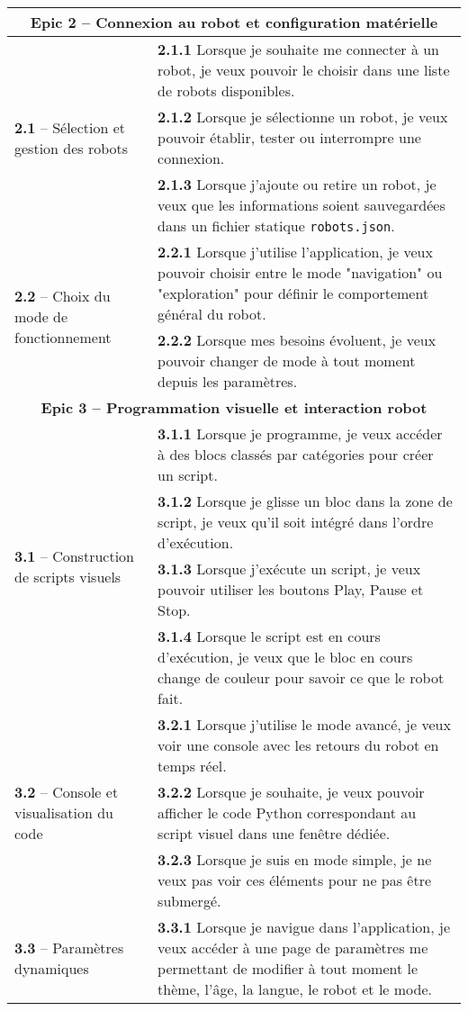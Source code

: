\begin{longtable}{|p{}|p{}|}
\multicolumn{2}{|c|}{\textbf{Epic 2 – Connexion au robot et configuration matérielle}} \\
\hline
\multirow{3}{=}{\textbf{2.1 } – Sélection et gestion des robots} & \textbf{2.1.1}  Lorsque je souhaite me connecter à un robot, je veux pouvoir le choisir dans une liste de robots disponibles. \\
 & \textbf{2.1.2}  Lorsque je sélectionne un robot, je veux pouvoir établir, tester ou interrompre une connexion. \\
 & \textbf{2.1.3}  Lorsque j’ajoute ou retire un robot, je veux que les informations soient sauvegardées dans un fichier statique \texttt{robots.json}. \\
\hline
\multirow{2}{=}{\textbf{2.2 } – Choix du mode de fonctionnement} & \textbf{2.2.1}  Lorsque j’utilise l’application, je veux pouvoir choisir entre le mode "navigation" ou "exploration" pour définir le comportement général du robot. \\
 & \textbf{2.2.2}  Lorsque mes besoins évoluent, je veux pouvoir changer de mode à tout moment depuis les paramètres. \\
\hline

\multicolumn{2}{|c|}{\textbf{Epic 3 – Programmation visuelle et interaction robot}} \\
\hline
\multirow{4}{=}{\textbf{3.1 } – Construction de scripts visuels} & \textbf{3.1.1}  Lorsque je programme, je veux accéder à des blocs classés par catégories pour créer un script. \\
 & \textbf{3.1.2}  Lorsque je glisse un bloc dans la zone de script, je veux qu’il soit intégré dans l’ordre d’exécution. \\
 & \textbf{3.1.3}  Lorsque j’exécute un script, je veux pouvoir utiliser les boutons Play, Pause et Stop. \\
 & \textbf{3.1.4}  Lorsque le script est en cours d’exécution, je veux que le bloc en cours change de couleur pour savoir ce que le robot fait. \\
\hline
\multirow{3}{=}{\textbf{3.2 } – Console et visualisation du code} & \textbf{3.2.1}  Lorsque j’utilise le mode avancé, je veux voir une console avec les retours du robot en temps réel. \\
 & \textbf{3.2.2}  Lorsque je souhaite, je veux pouvoir afficher le code Python correspondant au script visuel dans une fenêtre dédiée. \\
 & \textbf{3.2.3}  Lorsque je suis en mode simple, je ne veux pas voir ces éléments pour ne pas être submergé. \\
\hline
\textbf{3.3 } – Paramètres dynamiques & \textbf{3.3.1}  Lorsque je navigue dans l’application, je veux accéder à une page de paramètres me permettant de modifier à tout moment le thème, l’âge, la langue, le robot et le mode. \\
\hline


\end{longtable}
